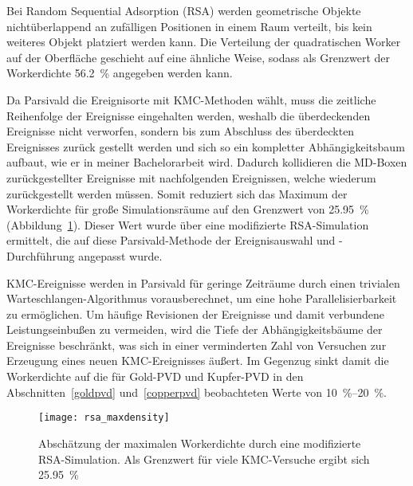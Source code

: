 Bei Random Sequential Adsorption (RSA) werden geometrische Objekte nichtüberlappend an zufälligen Positionen in einem Raum verteilt, bis kein weiteres Objekt platziert werden kann.
Die Verteilung der quadratischen Worker auf der Oberfläche geschieht auf eine ähnliche Weise, sodass als Grenzwert der Workerdichte \SI{56.2}{\percent}\cite{brosilow_random_1991} angegeben werden kann.

Da Parsivald die Ereignisorte mit KMC-Methoden wählt, muss die zeitliche Reihenfolge der Ereignisse eingehalten werden, weshalb die überdeckenden Ereignisse nicht verworfen, sondern bis zum Abschluss des überdeckten Ereignisses zurück gestellt werden und sich so ein kompletter Abhängigkeitsbaum aufbaut, wie er in meiner Bachelorarbeit wird\cite{lorenz_entwicklung_2012}.
Dadurch kollidieren die MD-Boxen zurückgestellter Ereignisse mit nachfolgenden Ereignissen, welche wiederum zurückgestellt werden müssen.
Somit reduziert sich das Maximum der Workerdichte für große Simulationsräume auf den Grenzwert von \SI{25.95}{\percent} (Abbildung~\ref{fig:rsamaxdensity}).
Dieser Wert wurde über eine modifizierte RSA-Simulation ermittelt, die auf diese Parsivald-Methode der Ereignisauswahl und -Durchführung angepasst wurde.

KMC-Ereignisse werden in Parsivald für geringe Zeiträume durch einen trivialen Warte\-schlangen-Algorithmus vorausberechnet, um eine hohe Parallelisierbarkeit zu ermöglichen.
Um häufige Revisionen der Ereignisse und damit verbundene Leistungseinbußen zu vermeiden, wird die Tiefe der Abhängigkeitsbäume der Ereignisse beschränkt, was sich in einer verminderten Zahl von Versuchen zur Erzeugung eines neuen KMC-Ereignisses äußert.
Im Gegenzug sinkt damit die Workerdichte auf die für Gold-PVD und Kupfer-PVD in den Abschnitten~\ref{goldpvd} und~\ref{copperpvd} beobachteten Werte von \SIrange{10}{20}{\percent}.

\vspace{2em}

\begin{figure}[h]
  \centering
  \texttt{[image: rsa\_maxdensity]}

  \caption[Abschätzung der maximalen Workerdichte per RSA-Simulation]{
    Abschätzung der maximalen Workerdichte durch eine modifizierte RSA-Simulation.
    Als Grenzwert für viele KMC-Versuche ergibt sich \SI{25.95}{\percent}
  }
  \label{fig:rsamaxdensity}

\end{figure}
